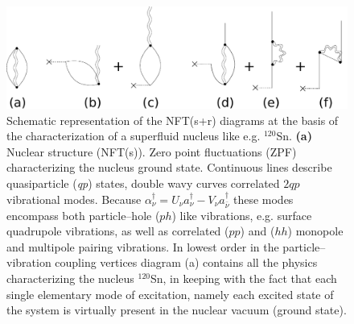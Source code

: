 \begin{figure}
\begin{center}
\includegraphics[width=\textwidth]{introduccion/figs/fig1_4_2.pdf}
\caption{Schematic representation of the NFT(s+r) diagrams at the basis of the characterization of a superfluid nucleus like e.g. $^{120}$Sn. \textbf{(a)} Nuclear structure (NFT(s)). Zero point fluctuations (ZPF) characterizing the nucleus ground state. Continuous lines describe quasiparticle (\textit{qp}) states, double wavy curves correlated $2qp$ vibrational modes. Because $\alpha^{\dagger}_{\nu}=U_\nu a^\dagger_\nu-V_\nu a^\dagger_{\bar{\nu}}$ these modes encompass both particle--hole ($ph$) like vibrations, e.g. surface quadrupole vibrations, as well as correlated ($pp$) and ($hh$) monopole and multipole pairing vibrations. In lowest order in the particle--vibration coupling vertices diagram (a) contains all the physics characterizing the nucleus $^{120}$Sn, in keeping with the fact that each single elementary mode of excitation, namely each excited state of the system is virtually present in the nuclear vacuum (ground state).}\label{fig1.4.2}
\end{center}
\end{figure}

